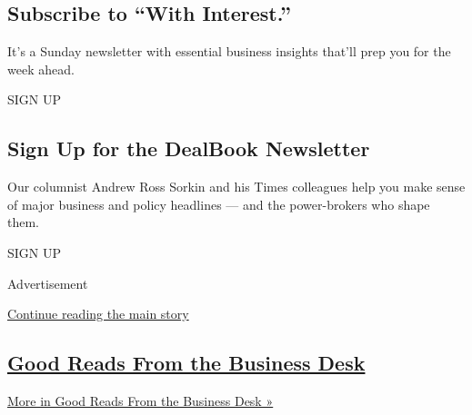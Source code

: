 \hypertarget{subscribe-to-with-interest}{%
\subsection{Subscribe to ``With
Interest.''}\label{subscribe-to-with-interest}}

It's a Sunday newsletter with essential business insights that'll prep
you for the week ahead.

SIGN UP

\hypertarget{sign-up-for-the-dealbook-newsletter}{%
\subsection{Sign Up for the DealBook
Newsletter}\label{sign-up-for-the-dealbook-newsletter}}

Our columnist Andrew Ross Sorkin and his Times colleagues help you make
sense of major business and policy headlines --- and the power-brokers
who shape them.

SIGN UP

Advertisement

\protect\hyperlink{after-mid1}{Continue reading the main story}

\hypertarget{good-reads-from-the-business-desk}{%
\subsection{\texorpdfstring{\href{/spotlight/editors-picks-business}{Good
Reads From the Business
Desk}}{Good Reads From the Business Desk}}\label{good-reads-from-the-business-desk}}

\href{/spotlight/editors-picks-business}{More in Good Reads From the
Business Desk »}


